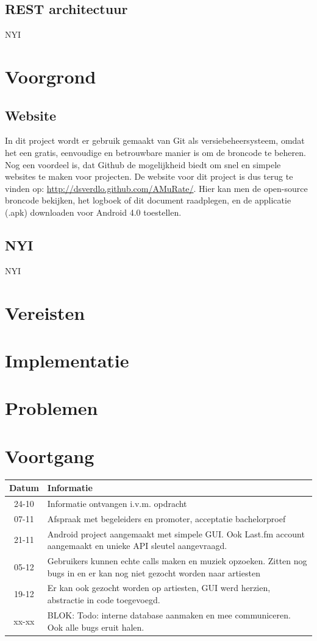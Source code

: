 \documentclass[11pt,a4paper]{article}
\begin{document}
	\subsection{REST architectuur}
	NYI
\section{Voorgrond}
	\subsection{Website}
		In dit project wordt er gebruik gemaakt van Git als versiebeheersysteem, omdat het een gratis, eenvoudige en betrouwbare manier is om de broncode te beheren. Nog een voordeel is, dat Github de mogelijkheid biedt om snel en simpele websites te maken voor projecten. De website voor dit project is dus terug te vinden op: \url{http://dsverdlo.github.com/AMuRate/}. Hier kan men de open-source broncode bekijken, het logboek of dit document raadplegen, en de applicatie (.apk) downloaden voor Android 4.0 toestellen.
	\subsection{NYI}
	NYI
\section{Vereisten}
\section{Implementatie}
\section{Problemen}
\section{Voortgang}
	\begin{tabular}{| c | p{\linewidth} | }
	\hline
	Datum & Informatie \\ \hline \hline 
	24-10 & Informatie ontvangen i.v.m. opdracht \\ \hline
	07-11 & Afspraak met begeleiders en promoter, acceptatie bachelorproef \\ \hline
	21-11 & Android project aangemaakt met simpele GUI. Ook Last.fm account aangemaakt en unieke API sleutel aangevraagd. \\ \hline
	05-12 & Gebruikers kunnen echte calls maken en muziek opzoeken. Zitten nog bugs in en er kan nog niet gezocht worden naar artiesten \\ \hline
	19-12 & Er kan ook gezocht worden op artiesten, GUI werd herzien, abstractie in code toegevoegd. \\ \hline
	xx-xx & BLOK: Todo: interne database aanmaken en mee communiceren. Ook alle bugs eruit halen. \\ \hline
	
	\end{tabular}
\end{document}
